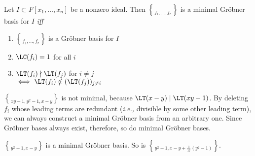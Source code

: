  Let $I\subset F[x_1,\dotsc,x_n]$ be a nonzero ideal.  Then $\brace{f_1,\dotsc,f_r}$ is a minimal Gr\"obner basis for $I$ \emph{iff}
\begin{enumerate}[label=(\arabic*)]
\item $\brace{f_1,\dotsc,f_r}$ is a Gr\"obner basis for $I$
\item $\LC(f_i)=1$ for all $i$
\item $\LT(f_i)\nmid\LT(f_j)$ for $i\neq j$ \\
$\iff\LT(f_i)\notin(\LT(f_j))_{j\neq i}$
\end{enumerate}
\eg $\brace{xy-1,y^2-1,x-y}$ is not minimal, because $\LT(x-y)\mid\LT(xy-1)$.
By deleting $f_i$ whose leading terms are redundant (\emph{i.e.,} divisible by some other leading term), we can always construct a minimal Gr\"obner basis from an arbitrary one.  Since Gr\"obner bases always exist, therefore, so do minimal Gr\"obner bases.

\eg $\brace{y^2-1,x-y}$ is a minimal Gr\"obner basis.  So is $\brace{y^2-1,x-y+\frac{1}{17}(y^2-1)}$.
